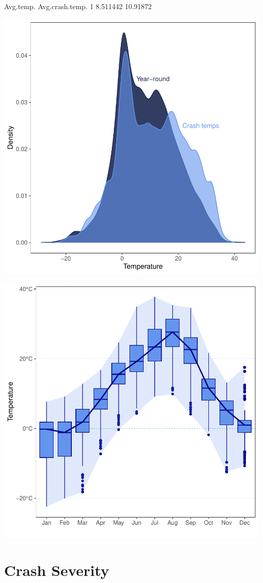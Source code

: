 \documentclass[11pt, a4paper]{article}
\begin{document}
\begin{Schunk}
\begin{Soutput}
  Avg.temp. Avg.crash.temp.
1  8.511442        10.91872
\end{Soutput}
\end{Schunk}
\includegraphics{variableinvestigation-007}



\includegraphics{variableinvestigation-008}









\pagebreak
\section{Crash Severity}
\end{document}
